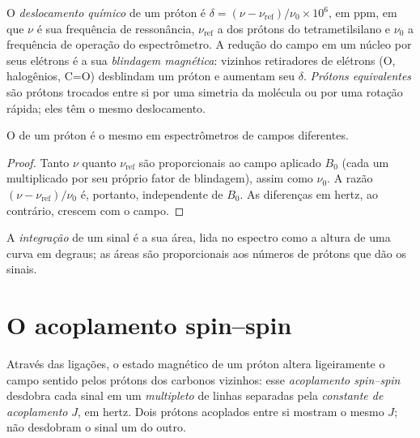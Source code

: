 \begin{definition}\label{def:b1:structure-spectroscopy:chemical-shift}
O \emph{deslocamento químico} de um próton é
$\delta = (\nu - \nu_{\text{ref}})/\nu_0 \times 10^6$, em \unit{ppm}, em que
$\nu$ é sua frequência de ressonância, $\nu_{\text{ref}}$ a dos prótons
do tetrametilsilano e $\nu_0$ a frequência de operação do
espectrômetro. A redução do campo em um núcleo por seus elétrons é a sua
\emph{blindagem magnética}: vizinhos retiradores de
elétrons (O, halogênios, C=O) desblindam um próton e aumentam seu
$\delta$. \emph{Prótons equivalentes} são prótons
trocados entre si por uma simetria da molécula ou por uma rotação
rápida; eles têm o mesmo deslocamento.
\end{definition}

\begin{proposition}\label{prop:b1:structure-spectroscopy:shift-field-independent}
O  de um próton é o mesmo em espectrômetros de
campos diferentes.
\end{proposition}

\begin{proof}
Tanto $\nu$ quanto $\nu_{\text{ref}}$ são proporcionais ao campo
aplicado $B_0$ (cada um multiplicado por seu próprio fator de
blindagem), assim como $\nu_0$. A razão $(\nu - \nu_{\text{ref}})/\nu_0$
é, portanto, independente de $B_0$. As diferenças em hertz, ao
contrário, crescem com o campo.
\end{proof}

\begin{definition}[Integração]\label{def:b1:structure-spectroscopy:integration}
A \emph{integração} de um sinal é a sua área, lida no
espectro como a altura de uma curva em degraus; as áreas são
proporcionais aos números de prótons que dão os sinais.
\end{definition}

\section{O acoplamento spin--spin}

\begin{definition}\label{def:b1:structure-spectroscopy:coupling}
Através das ligações, o estado magnético de um próton altera
ligeiramente o campo sentido pelos prótons dos carbonos vizinhos: esse
\emph{acoplamento spin--spin} desdobra cada sinal em
um \emph{multipleto} de linhas separadas pela
\emph{constante de acoplamento} $J$, em hertz. Dois
prótons acoplados entre si mostram o mesmo $J$;  não
desdobram o sinal um do outro.
\end{definition}

